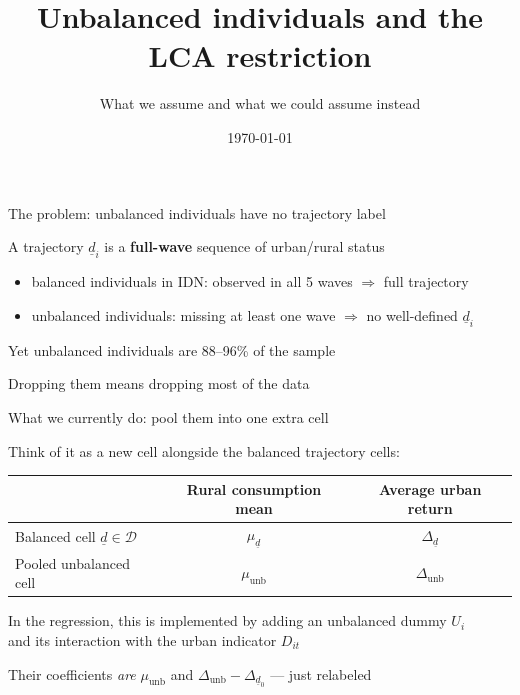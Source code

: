 \documentclass[10pt,aspectratio=169]{beamer}
\title{Unbalanced individuals and the LCA restriction}
\subtitle{What we assume and what we could assume instead}
\date{\today}
\newcommand{\D}{D}
\newcommand{\mud}{\mu_{\underline{d}}}
\newcommand{\munb}{\mu_{\mathrm{unb}}}
\newcommand{\Deltad}{\Delta_{\underline{d}}}
\newcommand{\Deltadz}{\Delta_{\underline{d}_0}}
\newcommand{\Deltaunb}{\Delta_{\mathrm{unb}}}
\begin{document}
\begin{frame}[plain]
  \titlepage
\end{frame}

\begin{frame}{The problem: unbalanced individuals have no trajectory label}

  A trajectory $\underline d_i$ is a \textbf{full-wave} sequence of urban/rural status

  \vspace{0.6em}
  \begin{itemize}
    \item balanced individuals in IDN: observed in all 5 waves $\Rightarrow$ full trajectory
    \item unbalanced individuals: missing at least one wave $\Rightarrow$ no well-defined $\underline d_i$
  \end{itemize}

  \vspace{0.8em}
  Yet unbalanced individuals are 88--96\% of the sample

  \vspace{0.4em}
  Dropping them means dropping most of the data

\end{frame}

\begin{frame}{What we currently do: pool them into one extra cell}

  Think of it as a new cell alongside the balanced trajectory cells:

  \vspace{0.9em}
  \begin{center}
  \begin{tabular}{lcc}
    \toprule
     & \textbf{Rural consumption mean} & \textbf{Average urban return} \\
    \midrule
    Balanced cell $\underline d \in \mathcal D$ & $\mud$ & $\Deltad$ \\[0.2em]
    Pooled unbalanced cell & $\munb$ & $\Deltaunb$ \\
    \bottomrule
  \end{tabular}
  \end{center}

  \vspace{1em}
  In the regression, this is implemented by adding an unbalanced dummy $U_i$ \\
  and its interaction with the urban indicator $\D_{it}$

  \vspace{0.4em}
  Their coefficients \emph{are} $\munb$ and $\Deltaunb - \Deltadz$ --- just relabeled

\end{frame}
\end{document}
